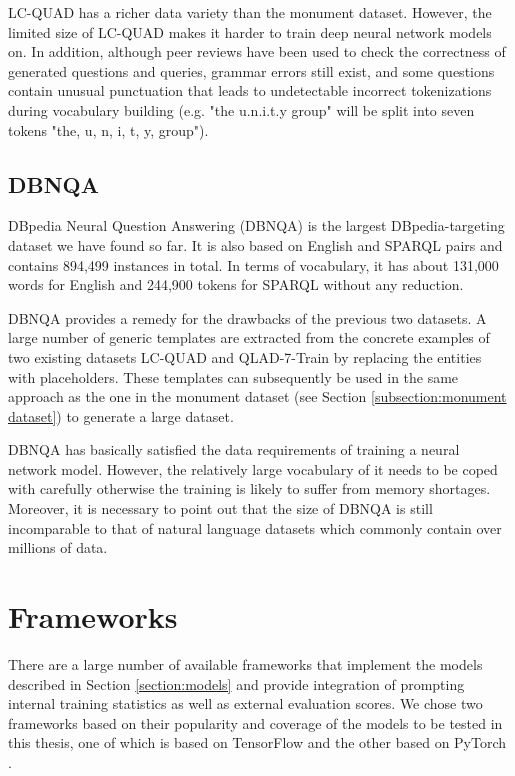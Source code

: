 LC-QUAD has a richer data variety than the monument dataset. However, the limited size of LC-QUAD makes it harder to train deep neural network models on. In addition, although peer reviews have been used to check the correctness of generated questions and queries, grammar errors still exist, and some questions contain unusual punctuation that leads to undetectable incorrect tokenizations during vocabulary building (e.g. "the u.n.i.t.y group" will be split into seven tokens "the, u, n, i, t, y, group").

\subsection{DBNQA} \label{subsection:dbnqa}

DBpedia Neural Question Answering (DBNQA) \cite{Soru2018dbnqa} is the largest DBpedia-targeting dataset we have found so far. It is also based on English and SPARQL pairs and contains 894,499 instances in total. In terms of vocabulary, it has about 131,000 words for English and 244,900 tokens for SPARQL without any reduction.

DBNQA provides a remedy for the drawbacks of the previous two datasets. A large number of generic templates are extracted from the concrete examples of two existing datasets LC-QUAD and QLAD-7-Train \cite{usbeck20177th} by replacing the entities with placeholders. These templates can subsequently be used in the same approach as the one in the monument dataset (see Section \ref{subsection:monument dataset}) to generate a large dataset.

DBNQA has basically satisfied the data requirements of training a neural network model. However, the relatively large vocabulary of it needs to be coped with carefully otherwise the training is likely to suffer from memory shortages. Moreover, it is necessary to point out that the size of DBNQA is still incomparable to that of natural language datasets which commonly contain over millions of data.

\section{Frameworks} \label{section:frameworks}

There are a large number of available frameworks that implement the models described in Section \ref{section:models} and provide integration of prompting internal training statistics as well as external evaluation scores. We chose two frameworks based on their popularity and coverage of the  models to be tested in this thesis, one of which is based on TensorFlow \cite{tensorflow2015-whitepaper} and the other based on PyTorch \cite{paszke2017automatic}.

